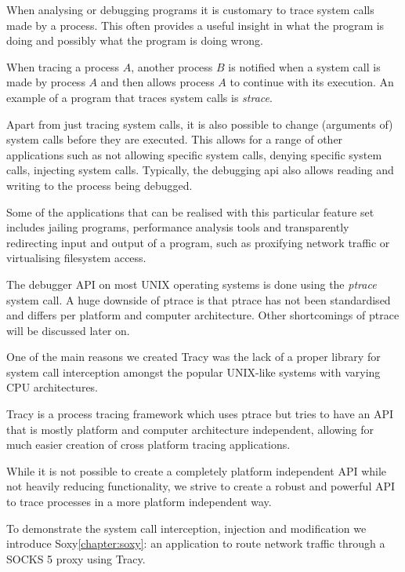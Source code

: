 \documentclass[a4paper, twoside, 10pt]{report}
\begin{document}
When analysing or debugging programs it is customary to trace system calls made
by a process. This often provides a useful insight in what the program is doing
and possibly what the program is doing wrong.

When tracing a process $A$, another process $B$ is notified when a system call
is made by process $A$  and then allows process $A$ to continue with its
execution. An example of a program that traces system calls is
\textit{strace}\cite{strace}.

Apart from just tracing system calls, it is also possible to change
(arguments of) system calls before they are executed. This allows for a range
of other applications such as not allowing specific system calls, denying
specific system calls, injecting system calls. Typically, the debugging api also
allows reading and writing to the process being debugged.

Some of the applications that can be realised with this particular feature set
includes jailing programs, performance analysis tools and transparently
redirecting input and output of a program, such as proxifying network
traffic or virtualising filesystem access.

The debugger API on most UNIX operating systems is done using the
\textit{ptrace} system call. A huge downside of ptrace is that ptrace
has not been standardised and differs per platform and computer architecture. Other
shortcomings of ptrace will be discussed later on.

One of the main reasons we created Tracy was the lack of a proper library
for system call interception amongst the popular UNIX-like systems with
varying CPU architectures.

Tracy is a process tracing framework which uses ptrace but tries to have an API
that is mostly platform and computer architecture independent, allowing for much
easier creation of cross platform tracing applications.

While it is not possible to create a completely platform independent API while
not heavily reducing functionality, we strive to create a robust and powerful
API to trace processes in a more platform independent way.

To demonstrate the system call interception, injection and modification
we introduce Soxy\ref{chapter:soxy}: an application to route network
traffic through a SOCKS 5 proxy using Tracy.

%
\end{document}
